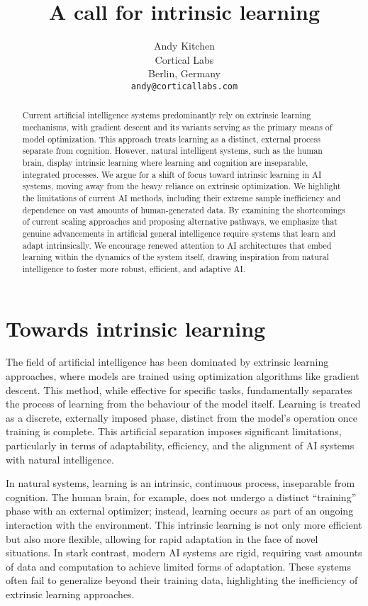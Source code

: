 \documentclass{article}
\title{A call for intrinsic learning}
\author{%
  Andy Kitchen\\
  Cortical Labs\\
  Berlin, Germany\\
  \texttt{andy@corticallabs.com}\\
}
\begin{document}
\maketitle


\begin{abstract}
Current artificial intelligence systems predominantly rely on extrinsic
learning mechanisms, with gradient descent and its variants serving as
the primary means of model optimization. This approach treats learning as
a distinct, external process separate from cognition. However, natural
intelligent systems, such as the human brain, display intrinsic learning
where learning and cognition are inseparable, integrated processes.
We argue for a shift of focus toward intrinsic learning in AI
systems, moving away from the heavy reliance on extrinsic optimization. We
highlight the limitations of current AI methods, including their extreme
sample inefficiency and dependence on vast amounts of human-generated
data. By examining the shortcomings of current scaling approaches and
proposing alternative pathways, we emphasize that genuine advancements in
artificial general intelligence require systems that learn and adapt
intrinsically. We encourage renewed attention to AI architectures
that embed learning within the dynamics of the system itself, drawing
inspiration from natural intelligence to foster more robust, efficient,
and adaptive AI.
\end{abstract}


\section{Towards intrinsic learning}

The field of artificial intelligence has been dominated by extrinsic
learning approaches, where models are trained using optimization
algorithms like gradient descent. This method, while effective for
specific tasks, fundamentally separates the process of learning from
the behaviour of the model itself. Learning is treated as a discrete,
externally imposed phase, distinct from the model's operation once
training is complete. This artificial separation imposes significant
limitations, particularly in terms of adaptability, efficiency, and the
alignment of AI systems with natural intelligence.

In natural systems, learning is an intrinsic, continuous process,
inseparable from cognition. The human brain, for example, does not undergo
a distinct ``training'' phase with an external optimizer; instead, learning
occurs as part of an ongoing interaction with the environment. This
intrinsic learning is not only more efficient but also more flexible,
allowing for rapid adaptation in the face of novel situations. In stark
contrast, modern AI systems are rigid, requiring vast amounts of data
and computation to achieve limited forms of adaptation. These systems
often fail to generalize beyond their training data, highlighting the
inefficiency of extrinsic learning approaches.
\end{document}
